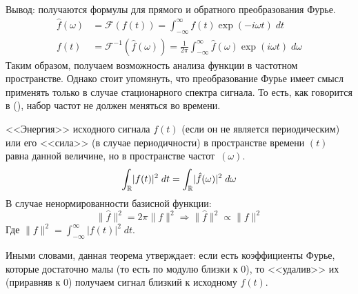 Вывод: получаются формулы для прямого и обратного преобразования Фурье.
\begin{equation}
	\begin{split}
		\hat{f}(\omega) & = \mathcal{F}(f(t)) = \int_{-\infty}^{\infty} f(t) \exp(-i \omega t) \; dt\\
		f(t) & = \mathcal{F}^{-1}(\hat{f}(\omega)) = \frac{1}{2 \pi} \int_{-\infty}^{\infty} \hat{f}(\omega) \exp(i \omega t) \; d\omega
	\end{split}
\end{equation}
Таким образом, получаем возможность анализа функции в частотном пространстве. Однако стоит упомянуть, что преобразование Фурье имеет смысл применять только в случае стационарного спектра сигнала. То есть, как говорится в (), набор частот не должен меняться во времени. 

\begin{theorem} \label{thm::parceval}
	<<Энергия>> исходного сигнала $f(t)$ (если он не является периодическим) или его <<сила>> (в случае периодичности) в пространстве времени $(t)$ равна данной величине, но в пространстве частот~$(\omega)$. 
	\begin{equation}
		\int_{\mathbb{R}} \lvert f(t) \rvert ^2 \; dt = \int_{\mathbb{R}} \lvert \hat{f}(\omega) \rvert ^2 \; d \omega
	\end{equation}
	В случае ненормированности базисной функции:
	\begin{equation}
		\lVert \hat{f} \rVert^2 = 2 \pi \lVert f \rVert^2 \Rightarrow \lVert \hat{f} \rVert^2 \propto \lVert f \rVert^2
	\end{equation}
	Где $\lVert f \rVert^2 = \int_{-\infty}^{\infty} \lvert f(t) \rvert^2 \; dt$.
\end{theorem}
Иными словами, данная теорема утверждает: если есть коэффициенты Фурье, которые достаточно малы (то есть по модулю близки к $0$), то <<удалив>> их (приравняв к $0$) получаем сигнал близкий к исходному $f(t)$.